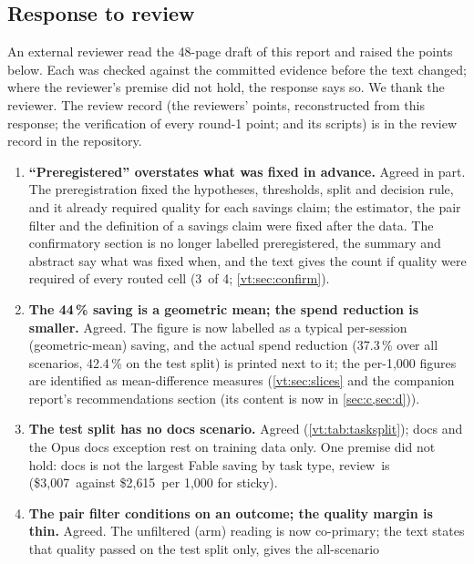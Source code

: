 \documentclass[11pt,letterpaper]{article}
\newcommand{\CfFableStickySaving}{44}
\newcommand{\RvBestTaskFableSticky}{review}
\newcommand{\RvNHypAllQuality}{3}
\newcommand{\RvSavDocsFableSticky}{2{,}615}
\newcommand{\RvSavReviewFableSticky}{3{,}007}
\newcommand{\RvSpendCutAll}{37.3}
\newcommand{\RvSpendCutTest}{42.4}
\begin{document}
\subsection{Response to review}\label{vt:app:review}

An external reviewer read the 48-page draft of this report and raised the points below. Each was checked against
the committed evidence before the text changed; where the reviewer's premise did not hold, the response says so.
We thank the reviewer. The review record (the reviewers' points, reconstructed from this response; the verification of
every round-1 point; and its scripts) is in the review record in the repository.

\begin{enumerate}[leftmargin=1.6em]
  \item \textbf{``Preregistered'' overstates what was fixed in advance.} Agreed in part. The preregistration fixed the
    hypotheses, thresholds, split and decision rule, and it already required quality for each savings claim; the
    estimator, the pair filter and the definition of a savings claim were fixed after the data. The confirmatory
    section is no longer labelled preregistered, the summary and abstract say what was fixed when, and the text
    gives the count if quality were required of every routed cell (\RvNHypAllQuality\ of 4; \cref{vt:sec:confirm}).
  \item \textbf{The \CfFableStickySaving\,\% saving is a geometric mean; the spend reduction is smaller.} Agreed. The
    figure is now labelled as a typical per-session (geometric-mean) saving, and the actual spend reduction
    (\RvSpendCutAll\,\% over all scenarios, \RvSpendCutTest\,\% on the test split) is printed next to it; the per-1,000
    figures are identified as mean-difference measures (\cref{vt:sec:slices} and the companion report's recommendations section (its content is now in \cref{sec:c,sec:d})).
  \item \textbf{The test split has no docs scenario.} Agreed (\cref{vt:tab:tasksplit}); docs and the Opus docs exception
    rest on training data only. One premise did not hold: docs is not the largest Fable saving by task type,
    \RvBestTaskFableSticky\ is (\$\RvSavReviewFableSticky\ against \$\RvSavDocsFableSticky\ per 1,000 for sticky).
  \item \textbf{The pair filter conditions on an outcome; the quality margin is thin.} Agreed. The unfiltered (arm)
    reading is now co-primary; the text states that quality passed on the test split only, gives the all-scenario

\end{enumerate}
\end{document}

